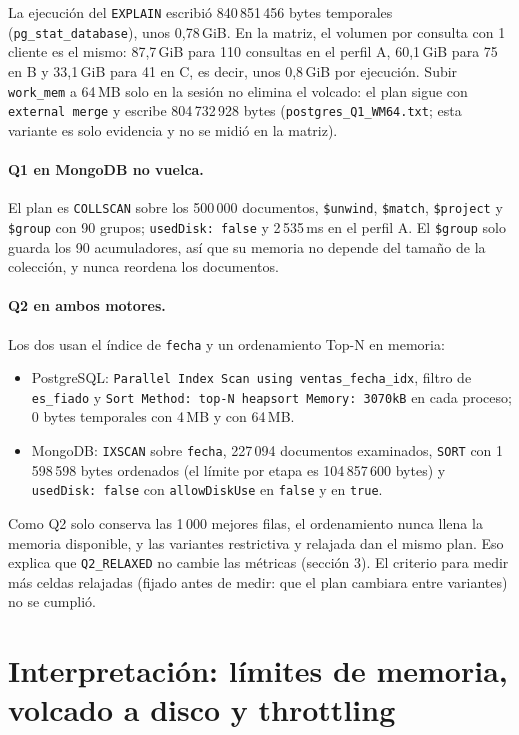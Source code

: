 \documentclass[11pt,a4paper]{article}
\newcommand{\cod}[1]{\texttt{#1}}
\begin{document}
\noindent La ejecución del \cod{EXPLAIN} escribió 840\,851\,456 bytes temporales
(\cod{pg\_stat\_database}), unos 0,78\,GiB. En la matriz, el volumen por consulta con 1
cliente es el mismo: 87,7\,GiB para 110 consultas en el perfil A, 60,1\,GiB para 75 en B
y 33,1\,GiB para 41 en C, es decir, unos 0,8\,GiB por ejecución. Subir \cod{work\_mem} a
64\,MB solo en la sesión no elimina el volcado: el plan sigue con \cod{external merge} y
escribe 804\,732\,928 bytes (\cod{postgres\_Q1\_WM64.txt}; esta variante es solo
evidencia y no se midió en la matriz).

\paragraph{Q1 en MongoDB no vuelca.} El plan es \cod{COLLSCAN} sobre los 500\,000
documentos, \cod{\$unwind}, \cod{\$match}, \cod{\$project} y \cod{\$group} con 90 grupos;
\cod{usedDisk: false} y 2\,535\,ms en el perfil A. El \cod{\$group} solo guarda los 90
acumuladores, así que su memoria no depende del tamaño de la colección, y nunca reordena
los documentos.

\paragraph{Q2 en ambos motores.} Los dos usan el índice de \cod{fecha} y un ordenamiento
Top-N en memoria:
\begin{itemize}
\item PostgreSQL: \cod{Parallel Index Scan using ventas\_fecha\_idx}, filtro de
  \cod{es\_fiado} y \cod{Sort Method: top-N heapsort Memory: 3070kB} en cada proceso;
  0 bytes temporales con 4\,MB y con 64\,MB.
\item MongoDB: \cod{IXSCAN} sobre \cod{fecha}, 227\,094 documentos examinados,
  \cod{SORT} con 1\,598\,598 bytes ordenados (el límite por etapa es 104\,857\,600 bytes) y
  \cod{usedDisk: false} con \cod{allowDiskUse} en \cod{false} y en \cod{true}.
\end{itemize}
Como Q2 solo conserva las 1\,000 mejores filas, el ordenamiento nunca llena la memoria
disponible, y las variantes restrictiva y relajada dan el mismo plan. Eso explica que
\cod{Q2\_RELAXED} no cambie las métricas (sección 3). El criterio para medir más celdas
relajadas (fijado antes de medir: que el plan cambiara entre variantes) no se cumplió.

\section{Interpretación: límites de memoria, volcado a disco y throttling}
\end{document}

